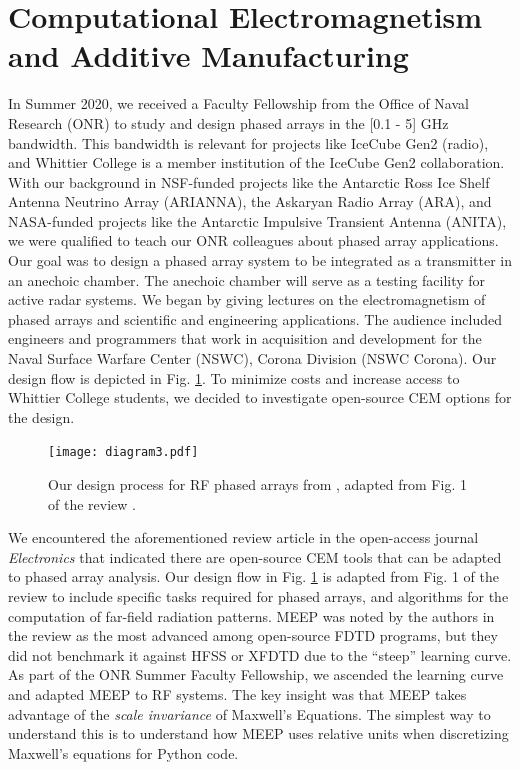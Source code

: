 \documentclass[../../main.tex]{subfiles}
\begin{document}
\section{Computational Electromagnetism and Additive Manufacturing}
\label{sec:cem}

In Summer 2020, we received a Faculty Fellowship from the Office of Naval Research (ONR) to study and design phased arrays in the [0.1 - 5] GHz bandwidth.  This bandwidth is relevant for projects like IceCube Gen2 (radio), and Whittier College is a member institution of the IceCube Gen2 collaboration.  With our background in NSF-funded projects like the Antarctic Ross Ice Shelf Antenna Neutrino Array (ARIANNA), the Askaryan Radio Array (ARA), and NASA-funded projects like the Antarctic Impulsive Transient Antenna (ANITA), we were qualified to teach our ONR colleagues about phased array applications.  Our goal was to design a phased array system to be integrated as a transmitter in an anechoic chamber.  The anechoic chamber will serve as a testing facility for active radar systems.  We began by giving lectures on the electromagnetism of phased arrays and scientific and engineering applications.  The audience included engineers and programmers that work in acquisition and development for the Naval Surface Warfare Center (NSWC), Corona Division (NSWC Corona).  Our design flow is depicted in Fig. \ref{fig:design}.  To minimize costs and increase access to Whittier College students, we decided to investigate open-source CEM options for the design. \\ \vspace{2.5mm}

\begin{figure}
\centering
\texttt{[image: diagram3.pdf]}
\caption{\label{fig:design}  Our design process for RF phased arrays from \cite{electronics10040415}, adapted from Fig. 1 of the review \cite{10.3390/electronics8121506}.}
\end{figure}

We encountered the aforementioned review article in the open-access journal \textit{Electronics} that indicated there are open-source CEM tools that can be adapted to phased array analysis.  Our design flow in Fig. \ref{fig:design} is adapted from Fig. 1 of the review to include specific tasks required for phased arrays, and algorithms for the computation of far-field radiation patterns.  MEEP was noted by the authors in the review as the most advanced among open-source FDTD programs, but they did not benchmark it against HFSS or XFDTD due to the ``steep'' learning curve.  As part of the ONR Summer Faculty Fellowship, we ascended the learning curve and adapted MEEP to RF systems.  The key insight was that MEEP takes advantage of the \textit{scale invariance} of Maxwell's Equations.  The simplest way to understand this is to understand how MEEP uses relative units when discretizing Maxwell's equations for Python code. \\ \vspace{2.5mm}
\end{document}
